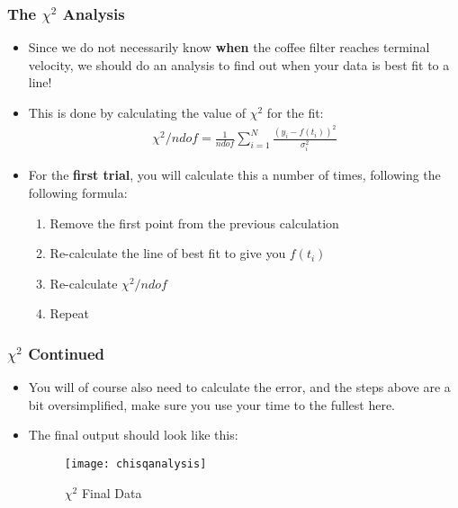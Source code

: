 \documentclass[aspectratio=169]{beamer}
\begin{document}
\begin{frame}
  \frametitle{The $\chi^2$ Analysis}
  \begin{itemize}
  \item Since we do not necessarily know \textbf{when} the coffee filter reaches terminal velocity, we should do an analysis to find out when your data is best fit to a line!
  \item This is done by calculating the value of $\chi^2$ for the fit:
    \begin{align*}
      \chi^2/ndof=\frac1{ndof}\sum_{i=1}^N\frac{(y_i-f(t_i))^2}{\sigma_i^2}
    \end{align*}
  \item For the \textbf{first trial}, you will calculate this a number of times, following the following formula:
    \begin{enumerate}
    \item Remove the first point from the previous calculation
    \item Re-calculate the line of best fit to give you $f(t_i)$
    \item Re-calculate $\chi^2/ndof$
    \item Repeat
    \end{enumerate}
  \end{itemize}
\end{frame}

\begin{frame}
  \frametitle{$\chi^2$ Continued}
  \begin{itemize}
  \item You will of course also need to calculate the error, and the steps above are a bit oversimplified, make sure you use your time to the fullest here.
  \item The final output should look like this:
    \begin{figure}[H]
      \centering
      \texttt{[image: chisqanalysis]}
      \caption{$\chi^2$ Final Data}
    \end{figure}
  \end{itemize}
\end{frame}
\end{document}
